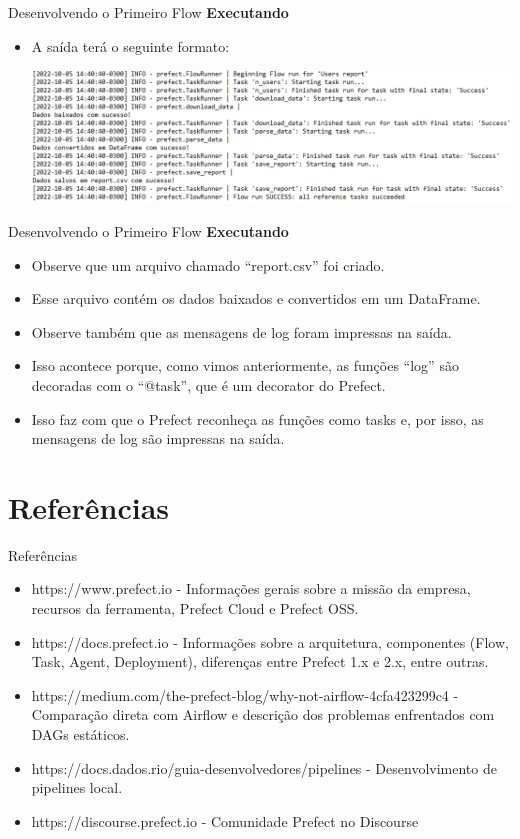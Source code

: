 \documentclass[t,serif]{beamer}
\begin{document}
	\begin{frame}{Desenvolvendo o Primeiro Flow}
		\textbf{Executando}
		\begin{itemize}
			\item A saída terá o seguinte formato:
			\begin{block}{}
				\begin{center}
					\includegraphics[width=\linewidth]{figs/2_13.png}
				\end{center}
			\end{block}
		\end{itemize}
	\end{frame}
	
	\begin{frame}{Desenvolvendo o Primeiro Flow}
		\textbf{Executando}
		\begin{itemize}
			\item Observe que um arquivo chamado ``report.csv'' foi criado.
			\item Esse arquivo contém os dados baixados e convertidos em um DataFrame.
			\item Observe também que as mensagens de log foram impressas na saída.
			\item Isso acontece porque, como vimos anteriormente, as funções ``log'' são decoradas com o ``@task'', que é um decorator do Prefect.
			\item Isso faz com que o Prefect reconheça as funções como tasks e, por isso, as mensagens de log são impressas na saída.
		\end{itemize}
	\end{frame}
	
\section{Referências}
	\begin{frame}{Referências}
		\begin{itemize}
			\item https://www.prefect.io - Informações gerais sobre a missão da empresa, recursos da ferramenta, Prefect Cloud e Prefect OSS.
			\item https://docs.prefect.io - Informações sobre a arquitetura, componentes (Flow, Task, Agent, Deployment), diferenças entre Prefect 1.x e 2.x, entre outras.
			\item https://medium.com/the-prefect-blog/why-not-airflow-4cfa423299c4 - Comparação direta com Airflow e descrição dos problemas enfrentados com DAGs estáticos.
			\item https://docs.dados.rio/guia-desenvolvedores/pipelines - Desenvolvimento de pipelines local.
			\item https://discourse.prefect.io - Comunidade Prefect no Discourse
		\end{itemize}
	\end{frame}
\end{document}
